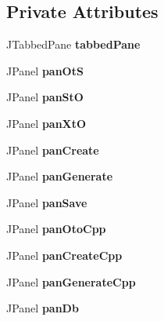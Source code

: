 \subsection*{Private Attributes}
\begin{DoxyCompactItemize}
\item 
\hypertarget{class_gui_a5d01eb139be015afd0cbfebdcb70bbf8}{
JTabbedPane {\bfseries tabbedPane}}
\label{class_gui_a5d01eb139be015afd0cbfebdcb70bbf8}

\item 
\hypertarget{class_gui_a36c033940690e4ae28871628ada56d72}{
JPanel {\bfseries panOtS}}
\label{class_gui_a36c033940690e4ae28871628ada56d72}

\item 
\hypertarget{class_gui_aa4a86659f9bd5c48fe76c06fe9d39fab}{
JPanel {\bfseries panStO}}
\label{class_gui_aa4a86659f9bd5c48fe76c06fe9d39fab}

\item 
\hypertarget{class_gui_acf464484241d8dbfc0160020ded1e579}{
JPanel {\bfseries panXtO}}
\label{class_gui_acf464484241d8dbfc0160020ded1e579}

\item 
\hypertarget{class_gui_a175eba9ba66e729568f24c0d053d5dc4}{
JPanel {\bfseries panCreate}}
\label{class_gui_a175eba9ba66e729568f24c0d053d5dc4}

\item 
\hypertarget{class_gui_a2536df4705c8c7847d7088c237297f93}{
JPanel {\bfseries panGenerate}}
\label{class_gui_a2536df4705c8c7847d7088c237297f93}

\item 
\hypertarget{class_gui_a0fdad8d45d7c1fc06f45cf8eabb58ec1}{
JPanel {\bfseries panSave}}
\label{class_gui_a0fdad8d45d7c1fc06f45cf8eabb58ec1}

\item 
\hypertarget{class_gui_a8f24ef032ffeca732e7490a7e6d8a517}{
JPanel {\bfseries panOtoCpp}}
\label{class_gui_a8f24ef032ffeca732e7490a7e6d8a517}

\item 
\hypertarget{class_gui_a4200668179c8238d5650f7185448ebaf}{
JPanel {\bfseries panCreateCpp}}
\label{class_gui_a4200668179c8238d5650f7185448ebaf}

\item 
\hypertarget{class_gui_a9a8c533bacd240721d0141c379970456}{
JPanel {\bfseries panGenerateCpp}}
\label{class_gui_a9a8c533bacd240721d0141c379970456}

\item 
\hypertarget{class_gui_a2d64f1be585e1c2dd56a2df9b38860da}{
JPanel {\bfseries panDb}}
\label{class_gui_a2d64f1be585e1c2dd56a2df9b38860da}


\end{DoxyCompactItemize}
